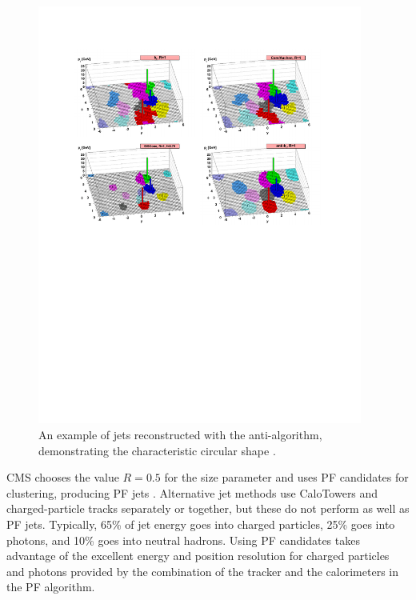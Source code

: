\documentclass[12pt]{thesis}  %
\begin{document}
\begin{figure}[hbt]
\begin{center}
\includegraphics[width=0.95\textwidth]{figures/08021189v2-fig.pdf}
\caption{An example of jets reconstructed with the anti-\kt algorithm, demonstrating the characteristic circular shape \cite{Cacciari:2008gp}.}
\label{fig:ak5-example}
\end{center}
\end{figure}

CMS chooses the value $R = 0.5$ for the size parameter and uses PF candidates for clustering, producing PF jets \cite{CMS-PAS-PFT-09-001, CMS-PAS-PFT-10-002}. Alternative jet methods use CaloTowers and charged-particle tracks separately or together, but these do not perform as well as PF jets. Typically, 65\% of jet energy goes into charged particles, 25\% goes into photons, and 10\% goes into neutral hadrons. Using PF candidates takes advantage of the excellent energy and position resolution for charged particles and photons provided by the combination of the tracker and the calorimeters in the PF algorithm.
\end{document}
